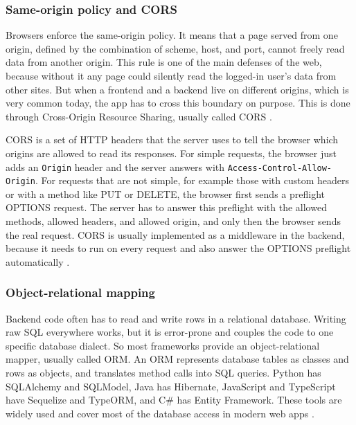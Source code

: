 \subsubsection{Same-origin policy and CORS}
\label{sec:cors}

Browsers enforce the same-origin policy. It means that a page served from one origin, defined by the combination of scheme, host, and port, cannot freely read data from another origin. This rule is one of the main defenses of the web, because without it any page could silently read the logged-in user's data from other sites. But when a frontend and a backend live on different origins, which is very common today, the app has to cross this boundary on purpose. This is done through Cross-Origin Resource Sharing, usually called CORS \autocite{cors_mdn_2026, cors_kong_2024}.

CORS is a set of HTTP headers that the server uses to tell the browser which origins are allowed to read its responses. For simple requests, the browser just adds an \texttt{Origin} header and the server answers with \texttt{Access-Control-Allow-Origin}. For requests that are not simple, for example those with custom headers or with a method like PUT or DELETE, the browser first sends a preflight OPTIONS request. The server has to answer this preflight with the allowed methods, allowed headers, and allowed origin, and only then the browser sends the real request. CORS is usually implemented as a middleware in the backend, because it needs to run on every request and also answer the OPTIONS preflight automatically \autocite{cors_mdn_2026, cors_kong_2024, chinthalapudi2025security}.

\subsubsection{Object-relational mapping}
\label{sec:orm}

Backend code often has to read and write rows in a relational database. Writing raw SQL everywhere works, but it is error-prone and couples the code to one specific database dialect. So most frameworks provide an object-relational mapper, usually called ORM. An ORM represents database tables as classes and rows as objects, and translates method calls into SQL queries. Python has SQLAlchemy and SQLModel, Java has Hibernate, JavaScript and TypeScript have Sequelize and TypeORM, and C\# has Entity Framework. These tools are widely used and cover most of the database access in modern web apps \autocite{hermanto2025orm_sql, ivanov2024orm_mysql, yan2016orm_wild}.

